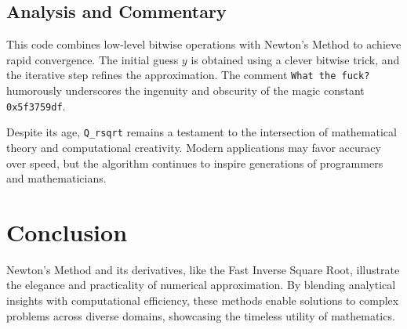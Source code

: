 \subsection*{Analysis and Commentary}
This code combines low-level bitwise operations with Newton's Method to achieve rapid convergence. The initial guess \(y\) is obtained using a clever bitwise trick, and the iterative step refines the approximation. The comment \texttt{What the fuck?} humorously underscores the ingenuity and obscurity of the magic constant \texttt{0x5f3759df}.

Despite its age, \texttt{Q\_rsqrt} remains a testament to the intersection of mathematical theory and computational creativity. Modern applications may favor accuracy over speed, but the algorithm continues to inspire generations of programmers and mathematicians.

\section*{Conclusion}
Newton's Method and its derivatives, like the Fast Inverse Square Root, illustrate the elegance and practicality of numerical approximation. By blending analytical insights with computational efficiency, these methods enable solutions to complex problems across diverse domains, showcasing the timeless utility of mathematics.
